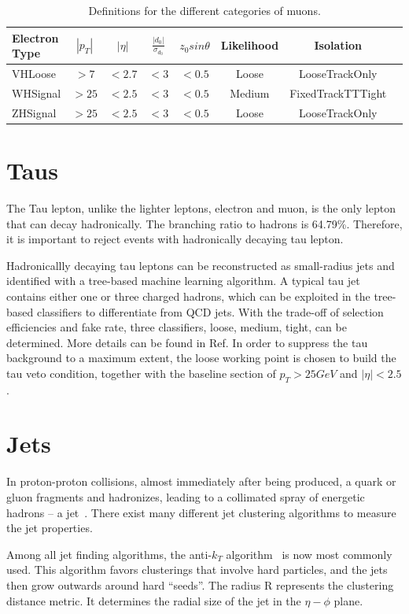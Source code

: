 \begin{table}[tbh]
    \centering
    \begin{tabular}{|l|c|c|c|c|c|c|c}
        \hline
        Electron Type & $|p_T|$ &$|\eta|$ & $\frac{|d_0|}{\sigma_{d_0}}$&$z_0 sin\theta$ & Likelihood &Isolation \\
        \hline
        VHLoose &$>7$&$<2.7$&$<3$&$<0.5$&Loose&LooseTrackOnly\\
        \hline
        WHSignal &$>25$&$<2.5$&$<3$&$<0.5$&Medium&FixedTrackTTTight\\
        \hline
        ZHSignal &$>25$&$<2.5$&$<3$&$<0.5$&Loose&LooseTrackOnly\\
        \hline
    \end{tabular}
    \caption{Definitions for the different categories of muons.}
    \label{tab:mu}
\end{table}

\section{Taus}
\label{sec:taus}

\par The Tau lepton, unlike the lighter leptons, electron and muon, 
is the only lepton that can decay hadronically. The branching ratio to hadrons is 64.79\%. Therefore, it is important to reject events with hadronically decaying tau lepton.

\par Hadronicallly decaying tau leptons can be reconstructed as small-radius jets and identified with a tree-based machine learning algorithm. A typical tau jet 
contains either one or three charged hadrons, which can be exploited in the tree-based classifiers to differentiate from QCD jets. With the trade-off of selection 
efficiencies and fake rate, three classifiers, loose, medium, tight, can be determined. More details can be found in Ref\cite{ATL-PHYS-PUB-2015-045}. 
In order to suppress the tau background to a maximum extent, the loose working point is chosen to build the tau veto condition, together with the baseline section of $p_T > 25 GeV$ and $|\eta| < 2.5$.

\section{Jets}
\label{sec:jets}

\par In proton-proton collisions, almost immediately after being produced, a quark or gluon fragments and hadronizes, leading to a collimated spray of energetic hadrons -- 
a jet~\cite{Salam:2009jx}. There exist many different jet clustering algorithms to measure the jet properties. 
\par Among all jet finding algorithms, the anti-$k_T$ algorithm~\cite{Cacciari:2008gn} is now most commonly used. This algorithm favors clusterings that involve hard particles, 
and the jets then grow outwards around hard ``seeds''. The radius R represents the clustering distance metric. It determines the radial size of the jet in the $\eta-\phi$ plane.

